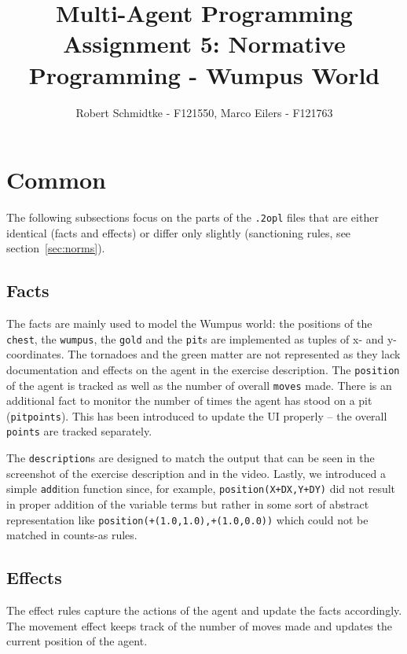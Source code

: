 \documentclass[a4paper,11pt]{article}
\begin{document}
\title{Multi-Agent Programming\\Assignment 5: Normative Programming - Wumpus World}
\author{Robert Schmidtke - F121550, Marco Eilers - F121763}

\maketitle
\newpage

\section{Common}
\label{sec:common}
The following subsections focus on the parts of the \texttt{.2opl} files that are either identical (facts and effects) or differ only slightly (sanctioning rules, see section~\ref{sec:norms}).

\subsection{Facts}
\label{sec:facts}
The facts are mainly used to model the Wumpus world: the positions of the \texttt{chest}, the \texttt{wumpus}, the \texttt{gold} and the \texttt{pit}s are implemented as tuples of x- and y-coordinates. The tornadoes and the green matter are not represented as they lack documentation and effects on the agent in the exercise description. The \texttt{position} of the agent is tracked as well as the number of overall \texttt{moves} made. There is an additional fact to monitor the number of times the agent has stood on a pit (\texttt{pitpoints}). This has been introduced to update the UI properly -- the overall \texttt{points} are tracked separately.

The \texttt{description}s are designed to match the output that can be seen in the screenshot of the exercise description and in the video. Lastly, we introduced a simple \texttt{add}ition function since, for example, \texttt{position(X+DX,Y+DY)} did not result in proper addition of the variable terms but rather in some sort of abstract representation like \texttt{position(+(1.0,1.0),+(1.0,0.0))} which could not be matched in counts-as rules.

\subsection{Effects}
\label{sec:effects}
The effect rules capture the actions of the agent and update the facts accordingly. The movement effect keeps track of the number of moves made and updates the current position of the agent.
\end{document}

